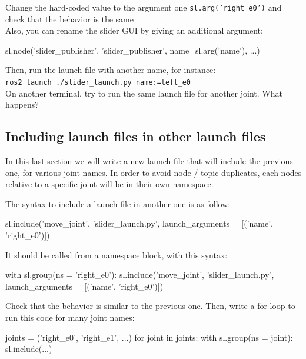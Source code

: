 \documentclass{ecnreport}
\begin{document}
Change the hard-coded value to the argument one \texttt{sl.arg('right\_e0')} and check that the behavior is the same\\

Also, you can rename the slider GUI by giving an additional argument:
\begin{pythoncodelarge}
sl.node('slider_publisher', 'slider_publisher', name=sl.arg('name'), ...)
\end{pythoncodelarge}

Then, run the launch file with another name, for instance:\\ \texttt{ros2 launch ./slider\_launch.py name:=left\_e0}\\
On another terminal, try to run the same launch file for another joint. What happens?\\



\subsection{Including launch files in other launch files}

In this last section we will write a new launch file that will include the previous one, for various joint names. In order to avoid node / topic duplicates, each nodes relative to a specific joint will be in their own namespace. 

The syntax to include a launch file in another one is as follow:
\begin{pythoncodelarge}
sl.include('move_joint', 'slider_launch.py', launch_arguments = [('name', 'right_e0')])
\end{pythoncodelarge}

It should be called from a namespace block, with this syntax:
\begin{pythoncodelarge}
with sl.group(ns = 'right_e0'):
  sl.include('move_joint', 'slider_launch.py', launch_arguments = [('name', 'right_e0')])
\end{pythoncodelarge}

Check that the behavior is similar to the previous one. Then, write a for loop to run this code for many joint names:
\begin{pythoncodelarge}
joints = ('right_e0', 'right_e1', ...)
for joint in joints:
    with sl.group(ns = joint):
        sl.include(...)
\end{pythoncodelarge}
\end{document}
